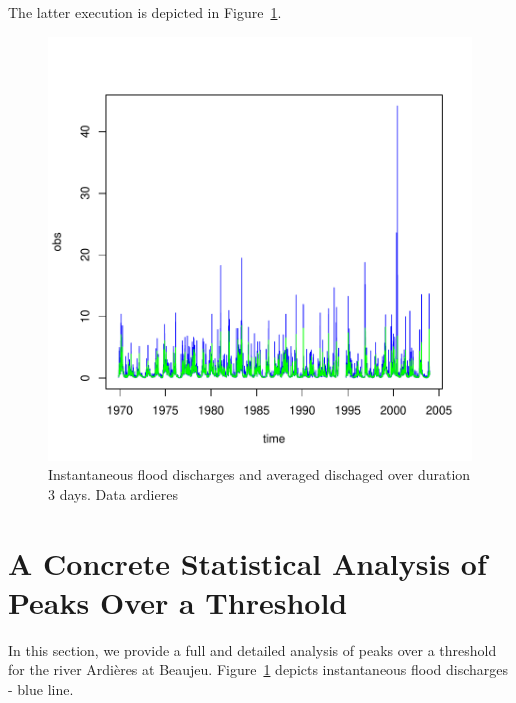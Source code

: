 \documentclass[a4paper]{article}
\numberwithin{equation}{section}
\theoremstyle{definition}
\begin{document}
The latter execution is depicted in Figure~\ref{fig:ts2tsd}.
\begin{figure}
\centering
\includegraphics{guide-036}
\caption{Instantaneous flood discharges and averaged dischaged over
  duration 3 days. Data ardieres}
\label{fig:ts2tsd}
\end{figure}

\section{A Concrete Statistical Analysis of Peaks Over a Threshold}
\label{sec:concAn}

In this section, we provide a full and detailed analysis of peaks over
a threshold for the river Ardi\`eres at
Beaujeu. Figure~\ref{fig:ts2tsd} depicts instantaneous flood
discharges - blue line.
\end{document}
